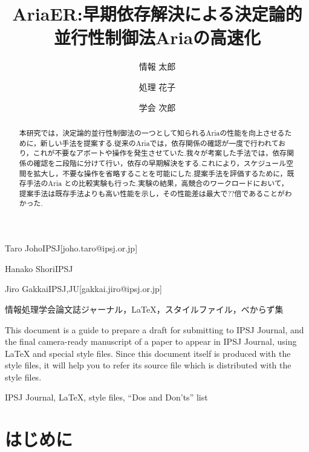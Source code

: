\documentclass[submit]{ipsj}
\begin{document}
\title{AriaER:早期依存解決による決定論的並行性制御法Ariaの高速化}





\author{情報 太郎}{Taro Joho}{IPSJ}[joho.taro@ipsj.or.jp]
\author{処理 花子}{Hanako Shori}{IPSJ}
\author{学会 次郎}{Jiro Gakkai}{IPSJ,JU}[gakkai.jiro@ipsj.or.jp]

\begin{abstract}
本研究では，決定論的並行性制御法の一つとして知られるAriaの性能を向上させるために，新しい手法を提案する.従来のAriaでは，依存関係の確認が一度で行われており，これが不要なアボートや操作を発生させていた.我々が考案した手法では，依存関係の確認を二段階に分けて行い，依存の早期解決をする.これにより，スケジュール空間を拡大し，不要な操作を省略することを可能にした.提案手法を評価するために，既存手法のAria との比較実験も行った.実験の結果，高競合のワークロードにおいて，提案手法は既存手法よりも高い性能を示し，その性能差は最大で??倍であることがわかった.
\end{abstract}


\begin{jkeyword}
情報処理学会論文誌ジャーナル，\LaTeX，スタイルファイル，べからず集
\end{jkeyword}

\begin{eabstract}
This document is a guide to prepare a draft for submitting to IPSJ
Journal, and the final camera-ready manuscript of a paper to appear in
IPSJ Journal, using {\LaTeX} and special style files.  Since this
document itself is produced with the style files, it will help you to
refer its source file which is distributed with the style files.
\end{eabstract}

\begin{ekeyword}
IPSJ Journal, \LaTeX, style files, ``Dos and Don'ts'' list
\end{ekeyword}

\maketitle

\section{はじめに}
\end{document}
